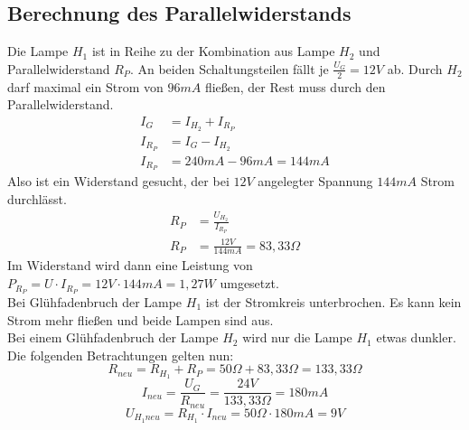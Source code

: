 \documentclass[
a4paper,     %
 headsepline, %
11pt         %
]{scrartcl}  %
\begin{document}
\subsection{Berechnung des Parallelwiderstands}
Die Lampe $H_1$ ist in Reihe zu der Kombination aus Lampe $H_2$ und Parallelwiderstand $R_P$. An beiden Schaltungsteilen fällt je $\frac{U_G}{2}=12V$ ab. Durch $H_2$ darf maximal ein Strom von $96mA$ fließen, der Rest muss durch den Parallelwiderstand.
\begin{align}
I_G &= I_{H_2} + I_{R_P} \nonumber \\
I_{R_P} &= I_G - I_{H_2}  \nonumber \\
I_{R_P} &= 240mA - 96mA = 144mA \nonumber
\end{align}
Also ist ein Widerstand gesucht, der bei $12V$ angelegter Spannung $144mA$ Strom durchlässt.
\begin{align}
R_P &= \frac{U_{H_2}}{I_{R_P}} \nonumber \\
R_P &= \frac{12V}{144mA} = 83,33 \Omega \nonumber 
\end{align}
Im Widerstand wird dann eine Leistung von $P_{R_P} = U \cdot I_{R_P} = 12V \cdot 144mA = 1,27W$ umgesetzt.\\
Bei Glühfadenbruch der Lampe $H_1$ ist der Stromkreis unterbrochen. Es kann kein Strom mehr fließen und beide Lampen sind aus.\\
Bei einem Glühfadenbruch der Lampe $H_2$ wird nur die Lampe $H_1$ etwas dunkler. Die folgenden Betrachtungen gelten nun:
\[R_{neu} = R_{H_1} + R_P = 50 \Omega + 83,33 \Omega = 133,33 \Omega \]
\[I_{neu} = \frac{U_G}{R_{neu}} = \frac{24V}{133,33 \Omega}=180mA \]
\[U_{H_{1}neu} = R_{H_1} \cdot I_{neu} = 50 \Omega \cdot 180mA = 9V \]



% 

% 
\end{document}
